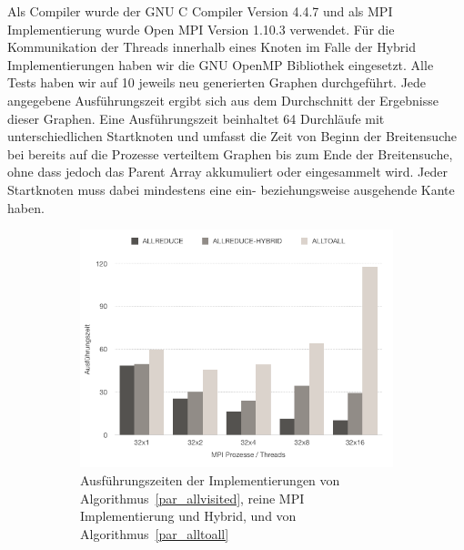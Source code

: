 \documentclass[11pt,a4paper]{article}
\begin{document}
Als Compiler wurde der GNU C Compiler Version 4.4.7 und als MPI Implementierung wurde Open MPI Version 1.10.3 verwendet. Für die Kommunikation der Threads innerhalb eines Knoten im Falle der Hybrid Implementierungen haben wir die GNU OpenMP Bibliothek eingesetzt. Alle Tests haben wir auf 10 jeweils neu generierten Graphen durchgeführt. Jede angegebene Ausführungszeit ergibt sich aus dem Durchschnitt der Ergebnisse dieser Graphen. Eine Ausführungszeit beinhaltet 64 Durchläufe mit unterschiedlichen Startknoten und umfasst die Zeit von Beginn der Breitensuche bei bereits auf die Prozesse verteiltem Graphen bis zum Ende der Breitensuche, ohne dass jedoch das Parent Array akkumuliert oder eingesammelt wird. Jeder Startknoten muss dabei mindestens eine ein- beziehungsweise ausgehende Kante haben.\\
\begin{figure}[h]
    \begin{subfigure}[b]{0.48\textwidth}
        \includegraphics[width=1\textwidth]{times_algo1}
        \caption{Ausführungszeiten der Implementierungen von Algorithmus~\ref{par_allvisited}, reine MPI Implementierung und Hybrid, und von Algorithmus~\ref{par_alltoall}}
        \label{fig:times1}
    \end{subfigure}
   \hspace{0em}
    \begin{subfigure}[b]{0.48\textwidth}

\end{subfigure}
\end{figure}
\end{document}
